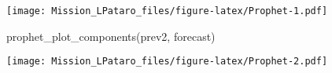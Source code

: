 \documentclass[
]{article}
\newenvironment{Shaded}{\begin{snugshade}}{\end{snugshade}}
\newcommand{\FunctionTok}[1]{\textcolor[rgb]{0.00,0.00,0.00}{#1}}
\newcommand{\NormalTok}[1]{#1}
\begin{document}
\texttt{[image: Mission\_LPataro\_files/figure-latex/Prophet-1.pdf]}

\begin{Shaded}
\begin{Highlighting}[]
\FunctionTok{prophet\_plot\_components}\NormalTok{(prev2, forecast)}
\end{Highlighting}
\end{Shaded}

\texttt{[image: Mission\_LPataro\_files/figure-latex/Prophet-2.pdf]}
\end{document}
